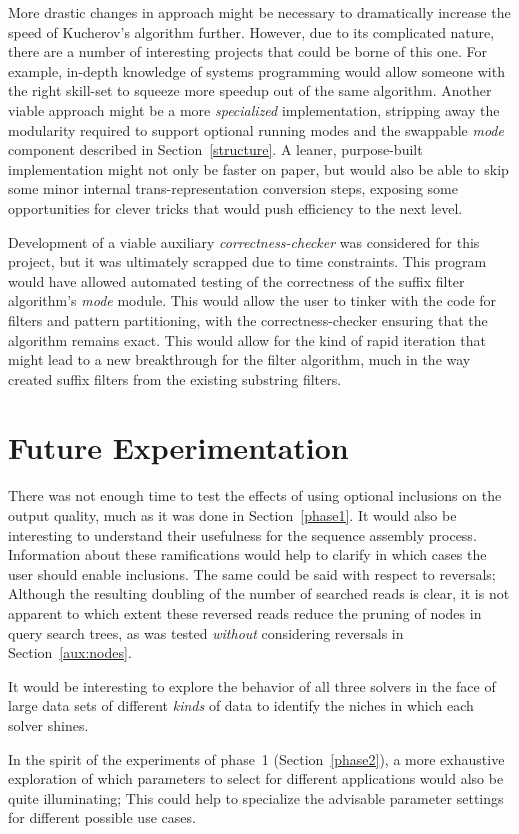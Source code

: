 More drastic changes in approach might be necessary to dramatically increase the speed of Kucherov's algorithm further. However, due to its complicated nature, there are a number of interesting projects that could be borne of this one. For example, in-depth knowledge of systems programming would allow someone with the right skill-set to squeeze more speedup out of the same algorithm. Another viable approach might be a more \textit{specialized} implementation, stripping away the modularity required to support optional running modes and the swappable \textit{mode} component described in Section~\ref{structure}. A leaner, purpose-built implementation might not only be faster on paper, but would also be able to skip some minor internal trans-representation conversion steps, exposing some opportunities for clever tricks that would push efficiency to the next level.

Development of a viable auxiliary \textit{correctness-checker} was considered for this project, but it was ultimately scrapped due to time constraints. This program would have allowed automated testing of the correctness of the \gls{suffix filter} algorithm's \textit{mode} module. This would allow the user to tinker with the code for \glspl{filter} and \gls{pattern} partitioning, with the  correctness-checker ensuring that the algorithm remains exact. This would allow for the kind of rapid iteration that might lead to a new breakthrough for the \gls{filter algorithm}, much in the way \kark{} created suffix filters from the existing \glspl{substring filter}. 

\section{Future Experimentation}

There was not enough time to test the effects of using optional \glspl{inclusion} on the output quality, much as it was done in Section~\ref{phase1}. It would also be interesting to understand their usefulness for the sequence assembly process. Information about these ramifications would help to clarify in which cases the user should enable inclusions. The same could be said with respect to \glspl{reversal}; Although the resulting doubling of the number of searched \glspl{read} is clear, it is not apparent to which extent these reversed reads reduce the pruning of nodes in \gls{query} search trees, as was tested \textit{without} considering reversals in Section~\ref{aux:nodes}.

It would be interesting to explore the behavior of all three solvers in the face of large data sets of different \textit{kinds} of data to identify the niches in which each solver shines.

In the spirit of the experiments of phase~1 (Section~\ref{phase2}), a more exhaustive exploration of which parameters to select for different applications would also be quite illuminating; This could help to specialize the advisable parameter settings for different possible use cases.
